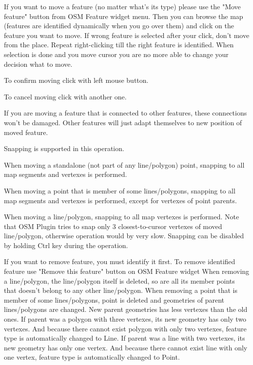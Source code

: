 
If you want to move a feature (no matter what's its type) please use the
"Move feature" button from OSM Feature widget menu. Then you can browse the 
map (features are identified dynamically when you go over them) and click 
on the feature you want to move. If wrong feature is
selected after your click, don't move from the place. Repeat right-clicking
till the right feature is identified. When selection is done and you move
cursor you are no more able to change your decision what to move.

To confirm moving click with left mouse button.

To cancel moving click with another one.

If you are moving a feature that is connected to other features, these
connections won't be damaged. Other features will just adapt themselves to
new position of moved feature.

Snapping is supported in this operation.

When moving a standalone (not part of any line/polygon) point, snapping to
all map segments and vertexes is performed.

When moving a point that is member of some lines/polygons, snapping to all
map segments and vertexes is performed, except for vertexes of point parents.

When moving a line/polygon, snapping to all map vertexes is performed. Note
that OSM Plugin tries to snap only 3 closest-to-cursor vertexes of moved
line/polygon, otherwise operation would by very slow.
Snapping can be disabled by holding Ctrl key during the operation.


If you want to remove feature, you must identify it first.
To remove identified feature use "Remove this feature" button on OSM Feature
widget   
When removing a line/polygon, the line/polygon itself is deleted, so are all
its member points that doesn't belong to any other line/polygon.
When removing a point that is member of some lines/polygons, point is deleted
and geometries of parent lines/polygons are changed. New parent geometries
has less vertexes than the old ones.
If parent was a polygon with three vertexes, its new geometry has only two
vertexes. And because there cannot exist polygon with only two vertexes,
feature type is automatically changed to Line.
If parent was a line with two vertexes, its new geometry has only one vertex.
And because there cannot exist line with only one vertex, feature type is
automatically changed to Point.

